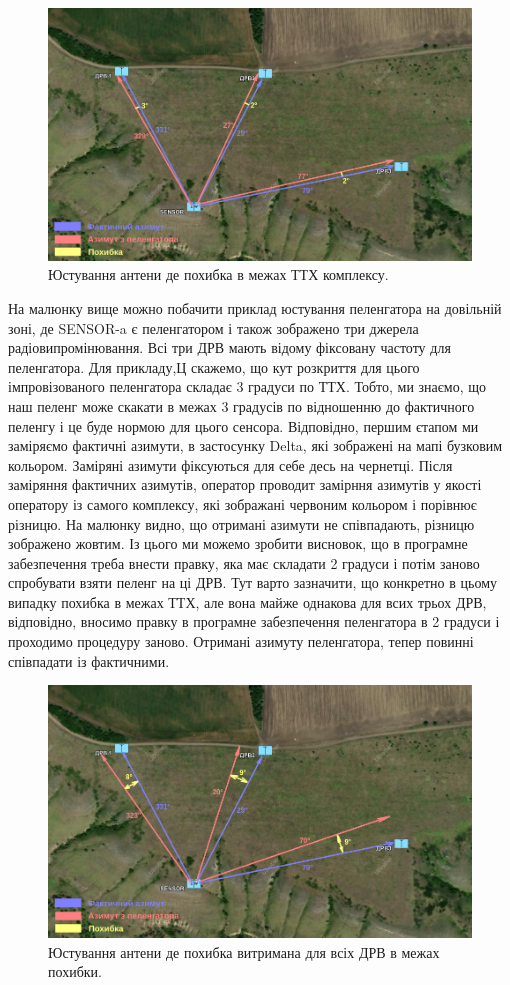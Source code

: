 \documentclass{article}
\begin{document}
\begin{figure}[H]
	\centering
	\includegraphics[width=0.9\linewidth]{images/adjustments_ideal.png}
	\caption{\label{fig:tsi} Юстування антени де похибка в межах ТТХ комплексу.}
\end{figure}

На малюнку вище можно побачити приклад юстування пеленгатора на довільній зоні, де SENSOR-a є пеленгатором і також зображено три джерела радіовипромінювання. Всі три ДРВ мають відому фіксовану частоту для пеленгатора. Для прикладу,Ц скажемо, що кут розкриття для цього імпровізованого пеленгатора складає 3 градуси по ТТХ. Тобто, ми знаємо, що наш пеленг може скакати в межах 3 градусів по відношенню до фактичного пеленгу і це буде нормою для цього сенсора. Відповідно, першим єтапом ми заміряємо фактичні азимути, в застосунку Delta, які зображені на мапі бузковим кольором. Заміряні азимути фіксуються для себе десь на чернетці. Після заміряння фактичних азимутів, оператор проводит замірння азимутів у якості оператору із самого комплексу, які зображані червоним кольором і порівнює різницю. На малюнку видно, що отримані азимути не співпадають, різницю зображено жовтим. Із цього ми можемо зробити висновок, що в програмне забезпечення треба внести правку, яка має складати 2 градуси і потім заново спробувати взяти пеленг на ці ДРВ. Тут варто зазначити, що конкретно в цьому випадку похибка в межах ТТХ, але вона майже однакова для всих трьох ДРВ, відповідно, вносимо правку в програмне забезпечення пеленгатора в 2 градуси і проходимо процедуру заново. Отримані азимуту пеленгатора, тепер повинні співпадати із фактичними.

\begin{figure}[H]
	\centering
	\includegraphics[width=0.9\linewidth]{images/adjustments_ideal2.png}
	\caption{\label{fig:tsi} Юстування антени де похибка витримана для всіх ДРВ в межах похибки.}
\end{figure}
\end{document}
